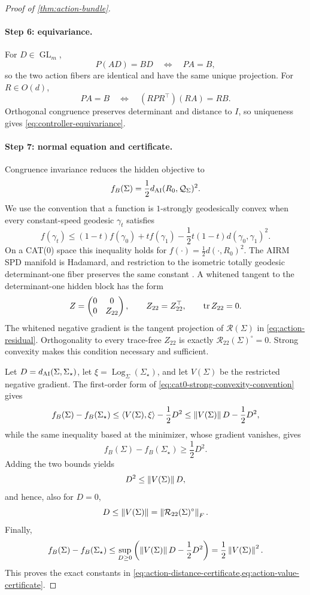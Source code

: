 \begin{proof}[Proof of \cref{thm:action-bundle}]
\paragraph{Step 6: equivariance.}
For \(D\in\operatorname{GL}_m\),
\[
  P(AD)=BD\quad\Longleftrightarrow\quad PA=B,
\]
so the two action fibers are identical and have the same unique projection.
For \(R\in O(d)\),
\[
  PA=B
  \quad\Longleftrightarrow\quad
  (RPR^\top)(RA)=RB.
\]
Orthogonal congruence preserves determinant and distance to \(I\), so
uniqueness gives \cref{eq:controller-equivariance}.

\paragraph{Step 7: normal equation and certificate.}
Congruence invariance reduces the hidden objective to
\[
  f_B(\Sigma)=\frac12d_{\mathrm{AI}}(R_0,\mathcal Q_\Sigma)^2.
\]
We use the convention that a function is \(1\)-strongly geodesically convex
when every constant-speed geodesic \(\gamma_t\) satisfies
\begin{equation}
  f(\gamma_t)
  \le (1-t)f(\gamma_0)+t f(\gamma_1)
  -\frac12t(1-t)d(\gamma_0,\gamma_1)^2.
  \label{eq:cat0-strong-convexity-convention}
\end{equation}
On a CAT(0) space this inequality holds for
\(f(\cdot)=\tfrac12d(\cdot,R_0)^2\).  The AIRM SPD manifold is Hadamard, and
restriction to the isometric totally geodesic determinant-one fiber preserves
the same constant \cite{bhatia2007positive,lim2004best}.
A whitened tangent to the determinant-one hidden block has the form
\[
  Z=\begin{pmatrix}0&0\\0&Z_{22}\end{pmatrix},
  \qquad Z_{22}=Z_{22}^\top,
  \qquad \operatorname{tr} Z_{22}=0.
\]
The whitened negative gradient is the tangent projection of
\(\mathcal R(\Sigma)\) in \cref{eq:action-residual}.  Orthogonality to every
trace-free \(Z_{22}\) is exactly
\(\mathcal R_{22}(\Sigma)^\circ=0\).  Strong convexity makes this condition
necessary and sufficient.

Let \(D=d_{\mathrm{AI}}(\Sigma,\Sigma_\star)\), let
\(\xi=\operatorname{Log}_\Sigma(\Sigma_\star)\), and let \(V(\Sigma)\) be the restricted
negative gradient.  The first-order form of
\cref{eq:cat0-strong-convexity-convention} gives
\[
  f_B(\Sigma)-f_B(\Sigma_\star)
  \le \langle V(\Sigma),\xi\rangle-\frac12D^2
  \le\left\lVert V(\Sigma)\right\rVert D-\frac12D^2,
\]
while the same inequality based at the minimizer, whose gradient vanishes,
gives
\[
  f_B(\Sigma)-f_B(\Sigma_\star)\ge\frac12D^2.
\]
Adding the two bounds yields
\[
  D^2\le\left\lVert V(\Sigma)\right\rVert D,
\]
and hence, also for \(D=0\),
\[
  D\le\left\lVert V(\Sigma)\right\rVert
  =\left\lVert \mathcal R_{22}(\Sigma)^\circ\right\rVert_F.
\]
Finally,
\[
  f_B(\Sigma)-f_B(\Sigma_\star)
  \le \sup_{D\ge0}
  \left(\left\lVert V(\Sigma)\right\rVert D-\frac12D^2\right)
  =\frac12\left\lVert V(\Sigma)\right\rVert^2.
\]
This proves the exact constants in
\cref{eq:action-distance-certificate,eq:action-value-certificate}.
\end{proof}


